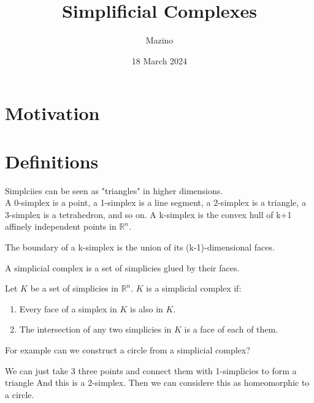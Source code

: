 \documentclass{article}
\title{Simplificial Complexes}
\author{Mazino}
\date{18 March 2024}
\begin{document}
\maketitle

\section{Motivation}

\section{Definitions}

\begin{definition}[Simplicies]

Simplciies can be seen as "triangles" in higher dimensions.\\
A 0-simplex is a point, a 1-simplex is a line segment, a 2-simplex is a triangle, a 3-simplex is a tetrahedron, and so on.
A k-simplex is the convex hull of k+1 affinely independent points in $\mathbb{R}^n$.
\end{definition}

\begin{remark}
    The boundary of a k-simplex is the union of its (k-1)-dimensional faces.
\end{remark}


A simplicial complex is a set of simplicies glued by their faces.

\begin{definition}
    Let $K$ be a set of simplicies in $\mathbb{R}^n$. $K$ is a simplicial complex if:
    \begin{enumerate}
        \item Every face of a simplex in $K$ is also in $K$.
        \item The intersection of any two simplicies in $K$ is a face of each of them.
    \end{enumerate}
\end{definition}

\begin{example}
    
\end{example}

For example can we construct a circle from a simplicial complex?

We can just take 3 three points and connect them with 1-simplicies to form a triangle And this is a 2-simplex. Then we can considere this as homeomorphic to a circle.
\end{document}
